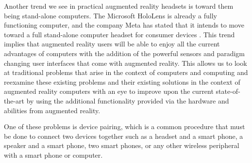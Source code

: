 \documentclass[12pt]{report}
\begin{document}
Another trend we see in practical augmented reality headsets is toward them being stand-alone computers. The Microsoft HoloLens is already a fully functioning computer, and the company Meta has stated that it intends to move toward a full stand-alone computer headset for consumer devices \cite{MetaWebsite}. This trend implies that augmented reality users will be able to enjoy all the current advantages of computers with the addition of the powerful sensors and paradigm changing user interfaces that come with augmented reality. This allows us to look at traditional problems that arise in the context of computers and computing and reexamine these existing problems and their existing solutions in the context of augmented reality computers with an eye to improve upon the current state-of-the-art by using the additional functionality provided via the hardware and abilities from augmented reality. \par

One of these problems is device pairing, which is a common procedure that must be done to connect two devices together such as a headset and a smart phone, a speaker and a smart phone, two smart phones, or any other wireless peripheral with a smart phone or computer. \par
\end{document}

